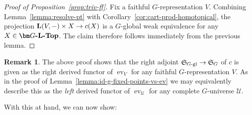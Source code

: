 \documentclass[reqno]{memo-l}
\theoremstyle{mythm}
\theoremstyle{definition}
\newtheorem{rk}[thm]{Remark}
\numberwithin{equation}{section}
\newcommand{\Uu}{{\mathcal{U}}}
\DeclareMathOperator{\ev}{ev}
\newcommand{\cat}[1]{\textbf{\textup{#1}}}
\newcommand{\consto}{\ensuremath{c}}
\newcommand{\myS}{{{\mathfrak S\kern-.4pt}}}
\begin{document}
\begin{proof}[Proof of Proposition~\ref{prop:triv-ff}]
    Fix a faithful $G$-representation $V$. Combining Lemma~\ref{lemma:resolve-pt} with Corollary~\ref{cor:cart-prod-homotopical}, the projection $\cat L(V,-)\times X\to\consto(X)$ is a $G$-global weak equivalence for any $X\in\cat{$\bm G$-$\cat{L}$-Top}$. The claim therefore follows immediately from the previous lemma.
\end{proof}

\begin{rk}\label{rk:ev-U-ra-const}
    The above proof shows that the right adjoint $\myS_\text{$G$-gl}\to\myS_G$ of $\consto$ is given as the right derived functor of $\ev_V$ for any faithful $G$-representation $V$. As in the proof of Lemma~\ref{lemma:id-g-fixed-points-vs-ev} we may equivalently describe this as the \emph{left} derived functor of $\ev_{\Uu}$ for any complete $G$-universe $\Uu$.
\end{rk}

With this at hand, we can now show:
\end{document}
